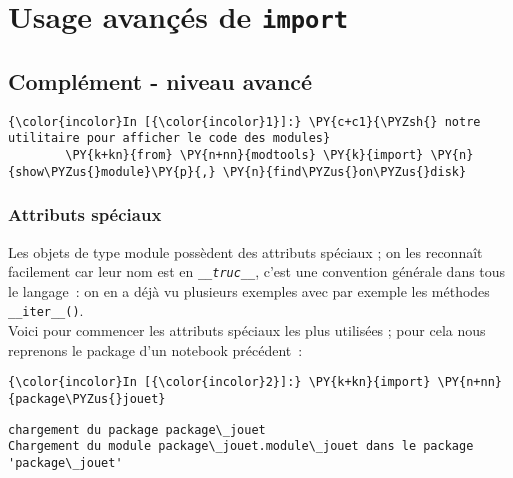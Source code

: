     \hypertarget{usage-avanuxe7uxe9s-de-import}{%
\section{\texorpdfstring{Usage avançés de
\texttt{import}}{Usage avançés de import}}\label{usage-avanuxe7uxe9s-de-import}}

    \hypertarget{compluxe9ment---niveau-avancuxe9}{%
\subsection{Complément - niveau
avancé}\label{compluxe9ment---niveau-avancuxe9}}

    \begin{Verbatim}[commandchars=\\\{\}]
{\color{incolor}In [{\color{incolor}1}]:} \PY{c+c1}{\PYZsh{} notre utilitaire pour afficher le code des modules}
        \PY{k+kn}{from} \PY{n+nn}{modtools} \PY{k}{import} \PY{n}{show\PYZus{}module}\PY{p}{,} \PY{n}{find\PYZus{}on\PYZus{}disk}
\end{Verbatim}


    \hypertarget{attributs-spuxe9ciaux}{%
\subsubsection{Attributs spéciaux}\label{attributs-spuxe9ciaux}}

    Les objets de type module possèdent des attributs spéciaux ; on les
reconnaît facilement car leur nom est en \emph{\texttt{\_\_truc\_\_}},
c'est une convention générale dans tous le langage~: on en a déjà vu
plusieurs exemples avec par exemple les méthodes
\texttt{\_\_iter\_\_()}.\\

    Voici pour commencer les attributs spéciaux les plus utilisées ; pour
cela nous reprenons le package d'un notebook précédent~:

    \begin{Verbatim}[commandchars=\\\{\}]
{\color{incolor}In [{\color{incolor}2}]:} \PY{k+kn}{import} \PY{n+nn}{package\PYZus{}jouet}
\end{Verbatim}


    \begin{Verbatim}[commandchars=\\\{\}]
chargement du package package\_jouet
Chargement du module package\_jouet.module\_jouet dans le package 'package\_jouet'

    \end{Verbatim}

